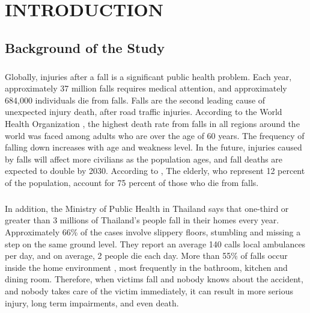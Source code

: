 \setlength{\parindent}{0in} 
\setlength{\parskip}{1em}
\setlength{\baselineskip}{1.6em}
\setlength{\parindent}{0em}              

\chapter{INTRODUCTION} 

\section{Background of the Study}
\paragraph{}
Globally, injuries after a fall is a significant public health problem. Each year, approximately 37 million falls requires medical attention, and approximately 684,000 individuals die from falls. Falls are the second leading cause of unexpected injury death, after road traffic injuries. According to the World Health Organization \cite{world_health_organization_2018}, the highest death rate from falls in all regions around the world was faced among adults who are over the age of 60 years. The frequency of falling down increases with age and weakness level. In the future, injuries caused by falls will affect more civilians as the population ages, and fall deaths are expected to double by 2030. According to \citeauthor{fuller_2013} \citeyear{fuller_2013}, The elderly, who represent 12 percent of the population, account for 75 percent of those who die from falls. 
 
 \paragraph{}
In addition, the Ministry of Public Health in Thailand \cite{thaincd.com_2019} says that one-third or greater than 3 millions of Thailand’s people fall in their homes every year. Approximately 66\% of the cases involve slippery floors, stumbling and missing a step on the same ground level. They report an average 140 calls local ambulances per day, and on average, 2 people die each day. More than 55\% of falls occur inside the home environment \cite{pynoos_steinman_nguyen_2010}, most frequently in the bathroom, kitchen and dining room. Therefore, when victims fall and nobody knows about the accident, and nobody takes care of the victim immediately, it can result in more serious injury, long term impairments, and even death.

